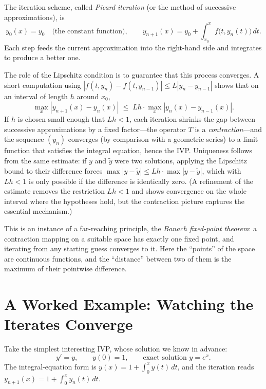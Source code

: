 \documentclass{essay}
\begin{document}
The iteration scheme, called \emph{Picard iteration} (or the method of successive approximations), is
\[
  y_0(x) = y_0 \quad \text{(the constant function)}, \qquad
  y_{n+1}(x) = y_0 + \int_{x_0}^{x} f\bigl(t, y_n(t)\bigr)\, dt.
\]
Each step feeds the current approximation into the right-hand side and integrates to produce a better one.

The role of the Lipschitz condition is to guarantee that this process converges. A short computation using $|f(t, y_{n}) - f(t, y_{n-1})| \leq L |y_n - y_{n-1}|$ shows that on an interval of length $h$ around $x_0$,
\[
  \max_x |y_{n+1}(x) - y_n(x)| \;\leq\; Lh \cdot \max_x |y_n(x) - y_{n-1}(x)|.
\]
If $h$ is chosen small enough that $Lh < 1$, each iteration shrinks the gap between successive approximations by a fixed factor---the operator $T$ is a \emph{contraction}---and the sequence $(y_n)$ converges (by comparison with a geometric series) to a limit function that satisfies the integral equation, hence the IVP. Uniqueness follows from the same estimate: if $y$ and $\tilde{y}$ were two solutions, applying the Lipschitz bound to their difference forces $\max |y - \tilde{y}| \leq Lh \cdot \max |y - \tilde{y}|$, which with $Lh < 1$ is only possible if the difference is identically zero. (A refinement of the estimate removes the restriction $Lh<1$ and shows convergence on the whole interval where the hypotheses hold, but the contraction picture captures the essential mechanism.)

This is an instance of a far-reaching principle, the \emph{Banach fixed-point theorem}: a contraction mapping on a suitable space has exactly one fixed point, and iterating from any starting guess converges to it. Here the ``points'' of the space are continuous functions, and the ``distance'' between two of them is the maximum of their pointwise difference.

\section{A Worked Example: Watching the Iterates Converge}

Take the simplest interesting IVP, whose solution we know in advance:
\[
  y' = y, \qquad y(0) = 1, \qquad \text{exact solution } y = e^x.
\]
The integral-equation form is $y(x) = 1 + \int_0^x y(t)\, dt$, and the iteration reads $y_{n+1}(x) = 1 + \int_0^x y_n(t)\, dt$.
\end{document}
